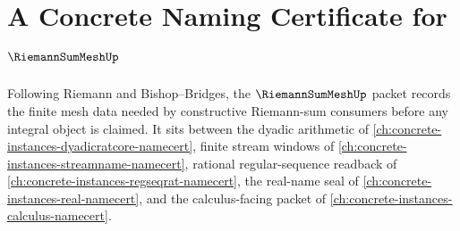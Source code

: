 \chapter{A Concrete Naming Certificate for $\RiemannSumMeshUp$}
\label{ch:concrete-instances-riemann-sum-mesh-namecert}

Following Riemann and Bishop--Bridges, the $\RiemannSumMeshUp$ packet records the finite mesh data needed by constructive Riemann-sum consumers before any integral object is claimed. It sits between the dyadic arithmetic of \autoref{ch:concrete-instances-dyadicratcore-namecert}, finite stream windows of \autoref{ch:concrete-instances-streamname-namecert}, rational regular-sequence readback of \autoref{ch:concrete-instances-regseqrat-namecert}, the real-name seal of \autoref{ch:concrete-instances-real-namecert}, and the calculus-facing packet of \autoref{ch:concrete-instances-calculus-namecert}.




